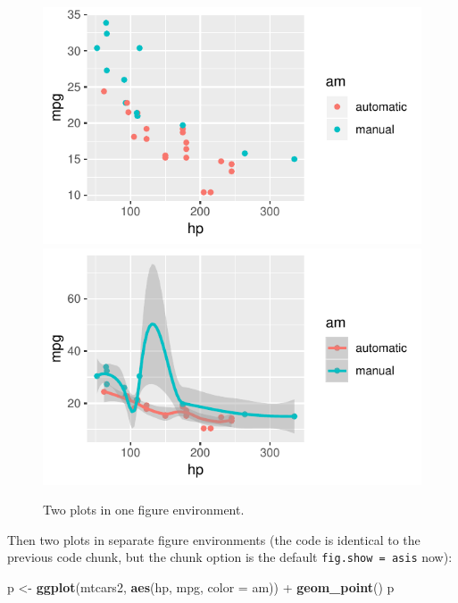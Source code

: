 \documentclass[]{tufte-handout}
\newenvironment{Shaded}{}{}
\newcommand{\DataTypeTok}[1]{\textcolor[rgb]{0.56,0.13,0.00}{#1}}
\newcommand{\KeywordTok}[1]{\textcolor[rgb]{0.00,0.44,0.13}{\textbf{#1}}}
\newcommand{\NormalTok}[1]{#1}
\newcommand{\OperatorTok}[1]{\textcolor[rgb]{0.40,0.40,0.40}{#1}}
\newcommand{\StringTok}[1]{\textcolor[rgb]{0.25,0.44,0.63}{#1}}
\begin{document}
\begin{figure}
\includegraphics{Epi_Notes_files/figure-latex/fig-two-together-1} \includegraphics{Epi_Notes_files/figure-latex/fig-two-together-2} \caption[Two plots in one figure environment]{Two plots in one figure environment.}\label{fig:fig-two-together}
\end{figure}

Then two plots in separate figure environments (the code is identical to
the previous code chunk, but the chunk option is the default
\texttt{fig.show\ =\ \textquotesingle{}asis\textquotesingle{}} now):

\begin{Shaded}
\begin{Highlighting}[]
\NormalTok{p <-}\StringTok{ }\KeywordTok{ggplot}\NormalTok{(mtcars2, }\KeywordTok{aes}\NormalTok{(hp, mpg, }\DataTypeTok{color =}\NormalTok{ am)) }\OperatorTok{+}
\StringTok{  }\KeywordTok{geom_point}\NormalTok{()}
\NormalTok{p}
\end{Highlighting}
\end{Shaded}
\end{document}
